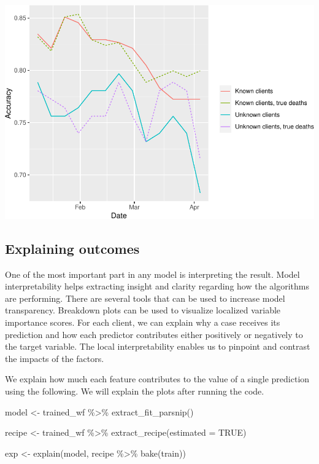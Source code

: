 \documentclass[
]{article}
\newenvironment{Shaded}{\begin{snugshade}}{\end{snugshade}}
\newcommand{\AttributeTok}[1]{\textcolor[rgb]{0.77,0.63,0.00}{#1}}
\newcommand{\ConstantTok}[1]{\textcolor[rgb]{0.00,0.00,0.00}{#1}}
\newcommand{\FunctionTok}[1]{\textcolor[rgb]{0.00,0.00,0.00}{#1}}
\newcommand{\NormalTok}[1]{#1}
\newcommand{\OtherTok}[1]{\textcolor[rgb]{0.56,0.35,0.01}{#1}}
\newcommand{\SpecialCharTok}[1]{\textcolor[rgb]{0.00,0.00,0.00}{#1}}
\begin{document}
\includegraphics{figures/report/fig-unnamed-chunk-59-1.pdf}

\hypertarget{explaining-outcomes}{%
\subsection{Explaining outcomes}\label{explaining-outcomes}}

One of the most important part in any model is interpreting the result.
Model interpretability helps extracting insight and clarity regarding
how the algorithms are performing. There are several tools that can be
used to increase model transparency. Breakdown plots can be used to
visualize localized variable importance scores. For each client, we can
explain why a case receives its prediction and how each predictor
contributes either positively or negatively to the target variable. The
local interpretability enables us to pinpoint and contrast the impacts
of the factors.

We explain how much each feature contributes to the value of a single
prediction using the following. We will explain the plots after running
the code.

\begin{Shaded}
\begin{Highlighting}[]
\NormalTok{model }\OtherTok{\textless{}{-}}
\NormalTok{  trained\_wf }\SpecialCharTok{\%\textgreater{}\%}
  \FunctionTok{extract\_fit\_parsnip}\NormalTok{()}

\NormalTok{recipe }\OtherTok{\textless{}{-}}
\NormalTok{  trained\_wf }\SpecialCharTok{\%\textgreater{}\%}
  \FunctionTok{extract\_recipe}\NormalTok{(}\AttributeTok{estimated =} \ConstantTok{TRUE}\NormalTok{)}

\NormalTok{exp }\OtherTok{\textless{}{-}} \FunctionTok{explain}\NormalTok{(model, recipe }\SpecialCharTok{\%\textgreater{}\%} \FunctionTok{bake}\NormalTok{(train))}
\end{Highlighting}
\end{Shaded}
\end{document}
